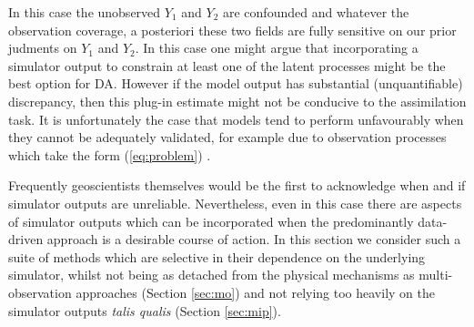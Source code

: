 \documentclass[10pt,a4paper]{article}
\begin{document}
\noindent In this case the unobserved $Y_1$ and $Y_2$ are confounded \citep[when $Y_1$ and $Y_2$ are multi-variate Gaussian, (\ref{eq:problem}) is a saturated collection of co-linear relationships, see][]{Hodges_2010} and whatever the observation coverage, a posteriori these two fields are fully sensitive on our prior judments on $Y_1$ and $Y_2$. In this case one might argue that incorporating a simulator output to constrain at least one of the latent processes might be the best option for DA. However if the model output has substantial (unquantifiable) discrepancy, then this plug-in estimate might not be conducive to the assimilation task. It is unfortunately the case that models tend to perform unfavourably when they cannot be adequately validated, for example due to observation processes which take the form (\ref{eq:problem}) \citep{Zammit_2014}.

Frequently geoscientists themselves would be the first to acknowledge when and if simulator outputs are unreliable.  Nevertheless, even in this case there are aspects of simulator outputs which can be incorporated when the predominantly data-driven approach is a desirable course of action. In this section we consider such a suite of methods which are selective in their dependence on the underlying simulator, whilst not being as detached from the physical mechanisms as multi-observation approaches (Section \ref{sec:mo}) and not relying too heavily on the simulator outputs \emph{talis qualis} (Section \ref{sec:mip}). 

\end{document}
